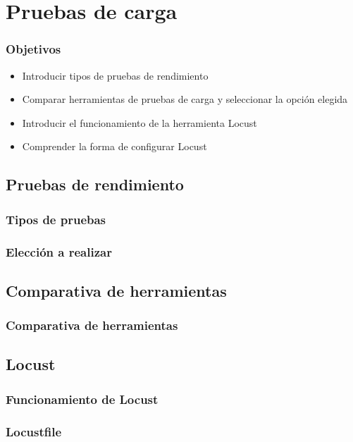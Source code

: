 \documentclass{beamer}
\theoremstyle{plain}
\theoremstyle{definition}
\theoremstyle{plain}
\theoremstyle{definition}
\theoremstyle{remark}
\theoremstyle{definition}
\begin{document}
\section{Pruebas de carga} %
\begin{frame}
	
	\frametitle{Objetivos}
	\begin{itemize}
		\item Introducir tipos de pruebas de rendimiento
		\item Comparar herramientas de pruebas de carga y seleccionar la opción elegida
		\item Introducir el funcionamiento de la herramienta Locust
		\item Comprender la forma de configurar Locust 
	\end{itemize}
	
\end{frame}

\subsection{Pruebas de rendimiento}
\begin{frame}
	\frametitle{Tipos de pruebas}
	
\end{frame}
\begin{frame}
	\frametitle{Elección a realizar}
	
\end{frame}

\subsection{Comparativa de herramientas}
\begin{frame}
	\frametitle{Comparativa de herramientas}
	
\end{frame}

\subsection{Locust}
\begin{frame}
	\frametitle{Funcionamiento de Locust}
	
\end{frame}
\begin{frame}
	\frametitle{Locustfile}
\end{frame}
\end{document}
